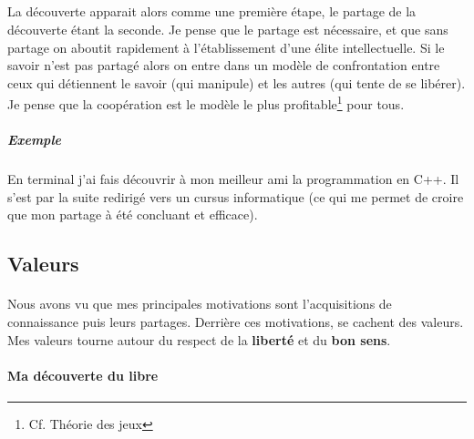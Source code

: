 \documentclass[a4paper,12pt, draft]{report}
\begin{document}
\subparagraph{}
La découverte apparait alors comme une première étape, le partage de la découverte étant la seconde. Je pense que le partage est nécessaire, et que sans partage on aboutit rapidement  à l'établissement d'une élite intellectuelle. Si le savoir n'est pas partagé alors on entre dans un modèle de confrontation entre ceux qui détiennent le savoir (qui manipule) et les autres (qui tente de se libérer). Je pense que la coopération est le modèle le plus profitable\footnote{Cf. Théorie des jeux} pour tous.

\subparagraph{Exemple} En terminal j'ai fais découvrir à mon meilleur ami la programmation en C++. Il s'est par la suite redirigé vers un cursus informatique (ce qui me permet de croire que mon partage à été concluant et efficace).




\subsection{Valeurs}
\paragraph{}
Nous avons vu que mes principales motivations sont l'acquisitions de connaissance puis leurs partages. Derrière ces motivations, se cachent des valeurs.
Mes valeurs tourne autour du respect de la \textbf{liberté} et du \textbf{bon sens}.



\paragraph{Ma découverte du libre}
\end{document}
